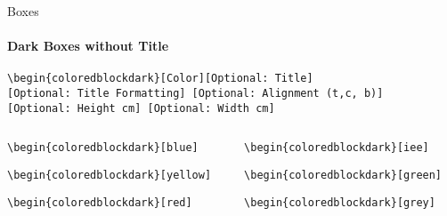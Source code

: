 \documentclass[aspectratio=169]{beamer}
\begin{document}
\begin{frame}{Boxes}
    \framesubtitle{Dark Boxes without Title}

    \vspace{-.8cm}
    \begin{coloredblock}[grey]
        \footnotesize\centering\texttt{\textbackslash begin\{coloredblockdark\}[Color][Optional:~Title][Optional:~Title~Formatting] [Optional:~Alignment (t,c, b)][Optional:~Height~cm] [Optional:~Width~cm]}
    \end{coloredblock}

    \vspace{-1.1cm}
    \begin{columns}
        \begin{column}{0.49\textwidth}

            \begin{coloredblockdark}[blue]
                \footnotesize\texttt{\textbackslash begin\{coloredblockdark\}[blue]}\strut
            \end{coloredblockdark}
    
            \begin{coloredblockdark}[yellow]
                \footnotesize\texttt{\textbackslash begin\{coloredblockdark\}[yellow]}\strut
            \end{coloredblockdark}
    
            \begin{coloredblockdark}[red]
                \footnotesize\texttt{\textbackslash begin\{coloredblockdark\}[red]}\strut
            \end{coloredblockdark}

        \end{column}
        \begin{column}{0.49\textwidth}
        
            \begin{coloredblockdark}[iee]
                \footnotesize\texttt{\textbackslash begin\{coloredblockdark\}[iee]}\strut
            \end{coloredblockdark}
    
            \begin{coloredblockdark}[green]
                \footnotesize\texttt{\textbackslash begin\{coloredblockdark\}[green]}\strut
            \end{coloredblockdark}
    
            \begin{coloredblockdark}[grey]
                \footnotesize\texttt{\textbackslash begin\{coloredblockdark\}[grey]}\strut
            \end{coloredblockdark}
        

\end{column}
\end{columns}
\end{frame}
\end{document}
